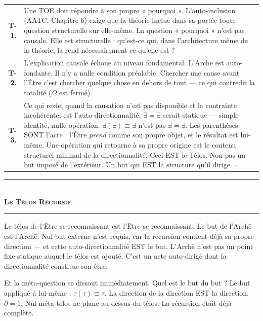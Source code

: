 \documentclass[10pt, openany, oneside]{book}
\renewcommand{\normalsize}{\fontsize{10}{13}\selectfont}
\renewcommand{\footnotesize}{\fontsize{8.5}{11}\selectfont}
\begin{document}
{\footnotesize
\noindent\begin{tabular}{r p{}}
\textbf{T-1.} & Une TOE doit répondre à son propre « pourquoi ». L'auto-inclusion (AATC, Chapitre 6) exige que la théorie inclue dans sa portée toute question structurelle sur elle-même. La question « pourquoi » n'est pas causale. Elle est structurelle : qu'est-ce qui, dans l'architecture même de la théorie, la rend nécessairement ce qu'elle est ? \\[0.3em]
\textbf{T-2.} & L'explication causale échoue au niveau fondamental. L'Arch\={e} est auto-fondante. Il n'y a nulle condition préalable. Chercher une cause avant l'Être c'est chercher quelque chose en dehors de tout --- ce qui contredit la totalité ($\Omega$ est fermé). \\[0.3em]
\textbf{T-3.} & Ce qui reste, quand la causation n'est pas disponible et la contrainte incohérente, est l'auto-directionnalité. $\exists = \exists$ serait statique --- simple identité, nulle opération. $\exists(\exists) \equiv \exists$ n'est pas $\exists = \exists$. Les parenthèses SONT l'acte : l'Être \textit{prend} comme son propre objet, et le résultat est lui-même. Une opération qui retourne à sa propre origine est le contenu structurel minimal de la directionnalité. Ceci EST le Télos. Non pas un but imposé de l'extérieur. Un but qui EST la structure qu'il dirige. $\square$ \\[0.3em]
\end{tabular}
}

\vspace{0.8em}

\begin{center}
    \rule{0.3\textwidth}{0.4pt}\\[0.5em]
    {\normalsize\bfseries\scshape Le Télos Récursif}\\[0.3em]
    \rule{0.3\textwidth}{0.4pt}
\end{center}

\vspace{1em}

\noindent Le télos de l'Être-se-reconnaissant est l'Être-se-reconnaissant. Le but de l'Arch\={e} est l'Arch\={e}. Nul but externe n'est requis, car la récursion contient déjà sa propre direction --- et cette auto-directionnalité EST le but. L'Arch\={e} n'est pas un point fixe statique auquel le télos est ajouté. C'est un acte auto-dirigé dont la directionnalité constitue son être.

Et la méta-question se dissout immédiatement. Quel est le but du but ? Le but appliqué à lui-même : $\tau(\tau) \equiv \tau$. La direction de la direction EST la direction. $\partial = 1$. Nul méta-télos ne plane au-dessus du télos. La récursion était déjà complète.
\end{document}
